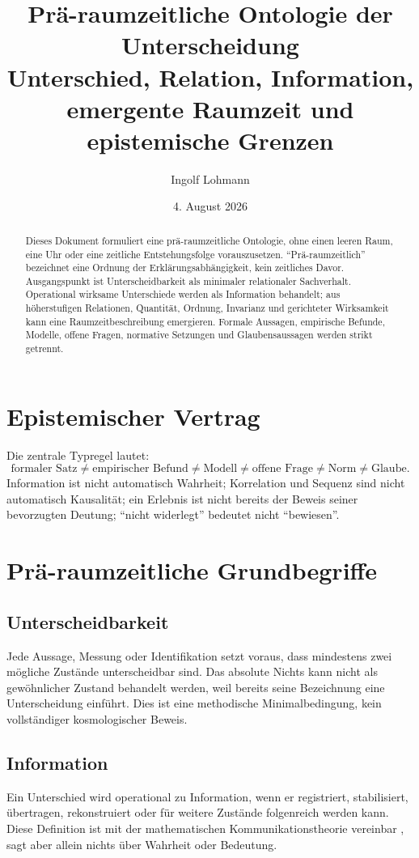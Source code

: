 \documentclass[11pt,a4paper]{scrartcl}
\title{Prä-raumzeitliche Ontologie der Unterscheidung\\
\large Unterschied, Relation, Information, emergente Raumzeit und epistemische Grenzen}
\author{Ingolf Lohmann}
\date{4. August 2026}
\begin{document}
\maketitle
\begin{abstract}
Dieses Dokument formuliert eine prä-raumzeitliche Ontologie, ohne einen leeren Raum,
eine Uhr oder eine zeitliche Entstehungsfolge vorauszusetzen. ``Prä-raumzeitlich''
bezeichnet eine Ordnung der Erklärungsabhängigkeit, kein zeitliches Davor. Ausgangspunkt
ist Unterscheidbarkeit als minimaler relationaler Sachverhalt. Operational wirksame
Unterschiede werden als Information behandelt; aus höherstufigen Relationen, Quantität,
Ordnung, Invarianz und gerichteter Wirksamkeit kann eine Raumzeitbeschreibung emergieren.
Formale Aussagen, empirische Befunde, Modelle, offene Fragen, normative Setzungen und
Glaubensaussagen werden strikt getrennt.
\end{abstract}

\section{Epistemischer Vertrag}
Die zentrale Typregel lautet:
\[
\text{formaler Satz}\neq\text{empirischer Befund}\neq\text{Modell}
\neq\text{offene Frage}\neq\text{Norm}\neq\text{Glaube}.
\]
Information ist nicht automatisch Wahrheit; Korrelation und Sequenz sind nicht
automatisch Kausalität; ein Erlebnis ist nicht bereits der Beweis seiner bevorzugten
Deutung; ``nicht widerlegt'' bedeutet nicht ``bewiesen''.

\section{Prä-raumzeitliche Grundbegriffe}
\subsection{Unterscheidbarkeit}
Jede Aussage, Messung oder Identifikation setzt voraus, dass mindestens zwei mögliche
Zustände unterscheidbar sind. Das absolute Nichts kann nicht als gewöhnlicher Zustand
behandelt werden, weil bereits seine Bezeichnung eine Unterscheidung einführt.
Dies ist eine methodische Minimalbedingung, kein vollständiger kosmologischer Beweis.

\subsection{Information}
Ein Unterschied wird operational zu Information, wenn er registriert, stabilisiert,
übertragen, rekonstruiert oder für weitere Zustände folgenreich werden kann. Diese
Definition ist mit der mathematischen Kommunikationstheorie vereinbar
\citep{Shannon1948a,Shannon1948b}, sagt aber allein nichts über Wahrheit oder Bedeutung.
\end{document}
